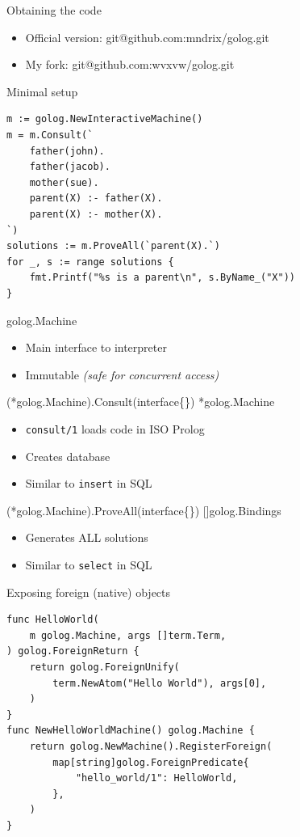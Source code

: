 \documentclass[presentation]{beamer}
\begin{document}
\begin{frame}[label=sec-3-1]{Obtaining the code}
\begin{itemize}
\item Official version: git@github.com:mndrix/golog.git
\item My fork: git@github.com:wvxvw/golog.git
\end{itemize}
\end{frame}

\begin{frame}[fragile,label=sec-3-2]{Minimal setup}
 \begin{verbatim}
m := golog.NewInteractiveMachine()
m = m.Consult(`
    father(john).
    father(jacob).
    mother(sue).
    parent(X) :- father(X).
    parent(X) :- mother(X).
`)
solutions := m.ProveAll(`parent(X).`)
for _, s := range solutions {
    fmt.Printf("%s is a parent\n", s.ByName_("X"))
}
\end{verbatim}
\end{frame}

\begin{frame}[label=sec-3-3]{golog.Machine}
\begin{itemize}
\item Main interface to interpreter
\item Immutable \emph{(safe for concurrent access)}
\end{itemize}
\end{frame}

\begin{frame}[fragile,label=sec-3-4]{(*golog.Machine).Consult(interface\{\}) *golog.Machine}
 \begin{itemize}
\item \texttt{consult/1} loads code in ISO Prolog
\item Creates database
\item Similar to \texttt{insert} in SQL
\end{itemize}
\end{frame}

\begin{frame}[fragile,label=sec-3-5]{(*golog.Machine).ProveAll(interface\{\}) []golog.Bindings}
 \begin{itemize}
\item Generates \alert{ALL} solutions
\item Similar to \texttt{select} in SQL
\end{itemize}
\end{frame}

\begin{frame}[fragile,label=sec-3-6]{Exposing foreign (native) objects}
 \begin{verbatim}
func HelloWorld(
    m golog.Machine, args []term.Term,
) golog.ForeignReturn {
    return golog.ForeignUnify(
        term.NewAtom("Hello World"), args[0],
    )
}
func NewHelloWorldMachine() golog.Machine {
    return golog.NewMachine().RegisterForeign(
        map[string]golog.ForeignPredicate{
            "hello_world/1": HelloWorld,
        },
    )
}
\end{verbatim}
\end{frame}
\end{document}
